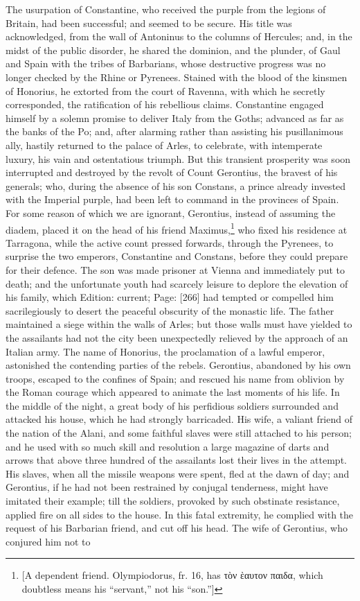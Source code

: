 The usurpation of Constantine, who received the purple from the legions of Britain, had been successful; and seemed to be secure. His title was acknowledged, from the wall of Antoninus to the columns of Hercules; and, in the midst of the public disorder, he shared the dominion, and the plunder, of Gaul and Spain with the tribes of Barbarians, whose destructive progress was no longer checked by the Rhine or Pyrenees. Stained with the blood of the kinsmen of Honorius, he extorted from the court of Ravenna, with which he secretly corresponded, the ratification of his rebellious claims. Constantine engaged himself by a solemn promise to deliver Italy from the Goths; advanced as far as the banks of the Po; and, after alarming rather than assisting his pusillanimous ally, hastily returned to the palace of Arles, to celebrate, with intemperate luxury, his vain and ostentatious triumph. But this transient prosperity was soon interrupted and destroyed by the revolt of Count Gerontius, the bravest of his generals; who, during the absence of his son Constans, a prince already invested with the Imperial purple, had been left to command in the provinces of Spain. For some reason of which we are ignorant, Gerontius, instead of assuming the diadem, placed it on the head of his friend Maximus,\footnote{[A dependent friend. Olympiodorus, fr. 16, has \textgreek{τ\texthebrew{ὸ}ν \texthebrew{ὲ}αυτον παιδα}, which doubtless means his \texthebrew{“}servant,\texthebrew{}” not his \texthebrew{“}son.\texthebrew{}”]} who fixed his residence at Tarragona, while the active count pressed forwards, through the Pyrenees, to surprise the two emperors, Constantine and Constans, before they could prepare for their defence. The son was made prisoner at Vienna and immediately put to death; and the unfortunate youth had scarcely leisure to deplore the elevation of his family, which Edition: current; Page: [266] had tempted or compelled him sacrilegiously to desert the peaceful obscurity of the monastic life. The father maintained a siege within the walls of Arles; but those walls must have yielded to the assailants had not the city been unexpectedly relieved by the approach of an Italian army. The name of Honorius, the proclamation of a lawful emperor, astonished the contending parties of the rebels. Gerontius, abandoned by his own troops, escaped to the confines of Spain; and rescued his name from oblivion by the Roman courage which appeared to animate the last moments of his life. In the middle of the night, a great body of his perfidious soldiers surrounded and attacked his house, which he had strongly barricaded. His wife, a valiant friend of the nation of the Alani, and some faithful slaves were still attached to his person; and he used with so much skill and resolution a large magazine of darts and arrows that above three hundred of the assailants lost their lives in the attempt. His slaves, when all the missile weapons were spent, fled at the dawn of day; and Gerontius, if he had not been restrained by conjugal tenderness, might have imitated their example; till the soldiers, provoked by such obstinate resistance, applied fire on all sides to the house. In this fatal extremity, he complied with the request of his Barbarian friend, and cut off his head. The wife of Gerontius, who conjured him not to 